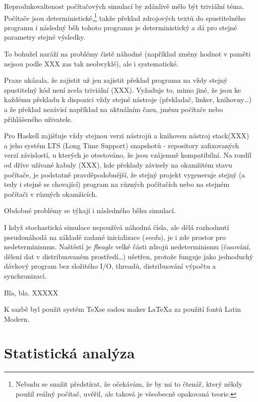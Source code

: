 \begin{tcolorbox}[ title={Reprodukovatelnost v počítačových simulacích}
                 , breakable
                 ]
Reprodukovaltenost počítačových simulací by zdánlivě mělo být triviální téma. Počítače jsou
deterministické,\footnote{
Nebudu se snažit předstírat, že očekávám, že by mi to čtenář, který někdy použil reálný počítač, uvěřil, ale
taková je všeobecně opakovaná teorie.
} takže překlad zdrojových textů do spustitelného programu i následný běh tohoto
programu je deterministický a dá pro stejné parametry stejné výsledky.

To bohužel naráží na problémy čistě náhodné (například  změny hodnot v paměti
nejsou podle XXX zas tak neobvyklé), ale i systematické.

Praxe ukázala, že zajistit už jen zajistit překlad programu na vždy stejný spustitelný kód není zcela triviální (XXX).
Vyžaduje to, mimo jiné, že jsou ke každému překladu k dispozici vždy stejné nástroje (překladač, linker,
knihovny\ldots) a že překlad nezávisí například na aktuálním času, jménu počítače nebo přihlášeného uživatele.

Pro Haskell zajišťuje vždy stejnou verzi nástrojů a knihoven nástroj stack(XXX) a jeho systém
LTS (Long Time Support) snapshotů - repository zafixovaných verzí závislostí, u kterých je
otestováno, že jsou vzájemně kompatibilní. Na rozdíl od dříve užívané kabaly (XXX), kde překlady
závisely na okamžitém stavu počítače, je podstatně pravděpodobnější, že stejný projekt vygeneruje
stejný (a tedy i stejně se chovající) program na různých počítačích nebo na stejném počítači v různých
okamžicích.

Obdobné problémy se týkají i následného běhu simulací.

I když stochastická simulace nepoužívá náhodná čísla, ale dělá rozhodnutí pseudonáhodá na základě zadané inicializace
(\textit{seedu}), je i zde prostor pro nedeterminismus. Naštěstí je \textit{fbeagle} velké části zdrojů
nedeterminismu (časování, dělení dat v distribuovaném prostředí\ldots) ušetřen, protože funguje jako
jednoduchý dávkový program bez složitého I/O, threadů, distribuování výpočtu a synchronizací.
\end{tcolorbox}



Bla, bla. XXXXX

K sazbě byl použit systém \TeX se sadou maker \LaTeX a za použití fontů Latin Modern.

\section{Statistická analýza}

